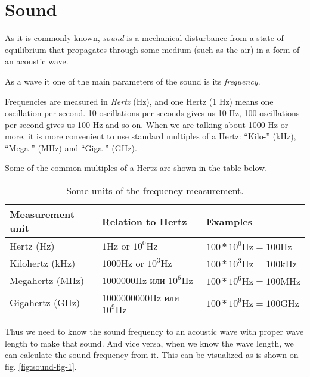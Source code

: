 \documentclass[../sparc.tex]{subfiles}
\begin{document}
\section{Sound}

As it is commonly known, \emph{sound} is a mechanical disturbance from a state
of equilibrium that propagates through some medium (such as the air) in a form
of an acoustic wave. \cite{britannica:sound}

As a wave it one of the main parameters of the sound is its \emph{frequency}.

Frequencies are measured in \emph{Hertz} (\gls{Hz}), and one Hertz (1 Hz) means
one oscillation per second.  10 oscillations per seconds gives us 10 Hz, 100
oscillations per second gives us 100 Hz and so on.  When we are talking about
1000 Hz or more, it is more convenient to use standard multiples of a Hertz:
``Kilo-'' (\gls{kHz}), ``Mega-'' (\gls{MHz}) and ``Giga-'' (\gls{GHz}).

Some of the common multiples of a Hertz are shown in the table below.

\begin{table}[h]
  \centering
  \begin{tabular}{p{3cm}|p{4cm}|p{3.5cm}}
    Measurement unit & Relation to Hertz & Examples \\
    \hline \hline
    Hertz (Hz)
    & $ 1 \mbox{Hz} $ or $ 10^0 \mbox{Hz} $
    & $ 100 * 10^0 \mbox{Hz} = 100 \mbox{Hz} $ \\
    \hline
    Kilohertz (kHz)
    & $ 1000 \mbox{Hz} $ or $ 10^3 \mbox{Hz} $
    & $ 100 * 10^3 \mbox{Hz} = 100 \mbox{kHz} $ \\
    \hline
    Megahertz (MHz)
    & $ 1000000 \mbox{Hz} $ или $ 10^6 \mbox{Hz} $
    & $ 100 * 10^6 \mbox{Hz} = 100 \mbox{MHz} $ \\
    \hline
    Gigahertz (GHz)
    & $ 1000000000 \mbox{Hz} $ или $ 10^9 \mbox{Hz} $
    & $ 100 * 10^9 \mbox{Hz} = 100 \mbox{GHz} $ \\
  \end{tabular}
  \caption{Some units of the frequency measurement.}
  \label{table:sound-hertz-scale}
\end{table}

Thus we need to know the sound frequency to an acoustic wave with proper wave
length to make that sound.  And vice versa, when we know the wave length, we can
calculate the sound frequency from it.  This can be visualized as is shown on
fig. \ref{fig:sound-fig-1}.
\end{document}
